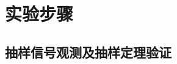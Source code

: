 \documentclass[../main]{subfiles}
\begin{document}
\section{实验步骤}%
\label{sec:\arabic{chapter}procedure}

\subsection{抽样信号观测及抽样定理验证}%
\label{sub:sample}


\end{document}
